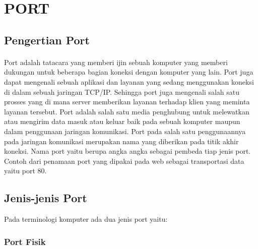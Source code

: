 

\section{PORT}
\subsection{Pengertian Port}
\paragraph{}
\hspace{1cm}
Port adalah tatacara yang memberi ijin sebuah komputer yang memberi dukungan untuk beberapa bagian koneksi dengan komputer yang lain. Port juga dapat mengenali sebuah aplikasi dan layanan yang sedang menggunakan koneksi di dalam sebuah jaringan TCP/IP. Sehingga port juga mengenali salah satu prosses yang di mana server memberikan layanan terhadap klien yang meminta layanan tersebut. Port adalah salah satu media penghubung untuk melewatkan atau mengirim data masuk atau keluar baik pada sebuah komputer maupun dalam penggunaan jaringan komunikasi. Port pada salah satu penggunaannya pada jaringan komunikasi merupakan nama yang diberikan pada titik akhir koneksi. Nama port yaitu berupa angka angka sebagai pembeda tiap  jenis port. Contoh dari penamaan port yang dipakai pada web sebagai transportasi data yaitu port 80.


\subsection{Jenis-jenis Port}
Pada terminologi komputer ada dua jenis port yaitu:
\subsubsection {Port Fisik}
